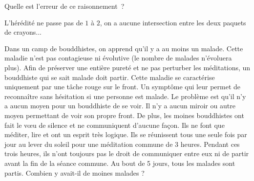 \documentclass{magnolia}
\begin{document}
Quelle est l'erreur de ce raisonnement~?

\begin{sol}
L'hérédité ne passe pas de $1$ à $2$, on a aucune intersection entre les deux paquets de crayons...
\end{sol}

Dans un camp de bouddhistes, on apprend qu'il y a au moins un malade. Cette maladie n'est pas contagieuse ni évolutive (le nombre de malades n'évoluera plus). Afin de préserver une entière pureté et ne pas perturber les méditations, un bouddhiste qui se sait malade doit partir.
Cette maladie se caractérise uniquement par une tâche rouge sur le front. Un symptôme qui leur permet de reconnaître sans hésitation si une personne est malade.
Le problème est qu'il n'y a aucun moyen pour un bouddhiste de se voir. Il n'y a aucun miroir ou autre moyen permettant de voir son propre front. De plus, les moines bouddhistes ont fait le vœu de silence et ne communiquent d'aucune façon. Ils ne font que méditer, lire et ont un esprit très logique.
Ils se réunissent tous une seule fois par jour au lever du soleil pour une méditation commune de 3 heures. Pendant ces trois heures, ils n'ont toujours pas le droit de communiquer entre eux ni de partir avant la fin de la séance commune. Au bout de 5 jours, tous les malades sont partis.
Combien y avait-il de moines malades ?

\end{document}
